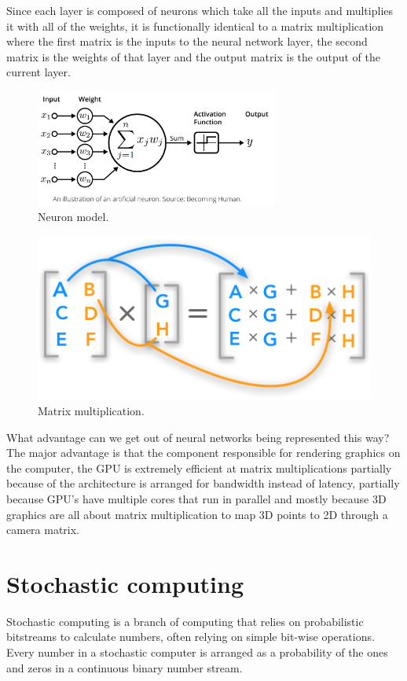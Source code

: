 \documentclass[a4paper,oneside,phd,etd]{BYUPhys}
\begin{document}
Since each layer is composed of neurons which take all the inputs and multiplies it with all of the weights, it is functionally identical to a matrix multiplication where the first matrix is the inputs to the neural network layer, the second matrix is the weights of that layer and the output matrix is the output of the current layer.
\begin{figure}[H]
\centering
\includegraphics[width=8cm]{pictures/neuron_model.png}
\caption{Neuron model\cite{fig:neuron_model}.}
\label{fig:neuron_model}
\end{figure}
\begin{figure}[H]
\centering
\includegraphics[scale=0.5]{pictures/matrix-multiply.png}
\caption{Matrix multiplication\cite{fig:matrix-multiply}.}
\label{fig:neuron_model}
\end{figure}
What advantage can we get out of neural networks being represented this way? The major advantage is that the component responsible for rendering graphics on the computer, the GPU is extremely efficient at matrix multiplications partially because of the architecture is arranged for bandwidth instead of latency, partially because GPU's have multiple cores that run in parallel and mostly because 3D graphics are all about matrix multiplication to map 3D points to 2D through a camera matrix.

\section{Stochastic computing}
Stochastic computing is a branch of computing that relies on probabilistic bitstreams to calculate numbers, often relying on simple bit-wise operations. Every number in a stochastic computer is arranged as a probability of the ones and zeros in a continuous binary number stream\cite{6800290}. 
\end{document}
